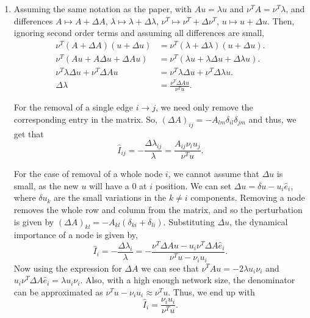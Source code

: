\documentclass[a4paper]{article}
\begin{document}
\begin{enumerate}[label={(6. \alph*)}]
    \item Assuming the same notation as the paper, with $Au = \lambda u$ and $\nu^T A = \nu^T \lambda$, and differences  $A \mapsto A + \Delta A$, $\lambda \mapsto \lambda + \Delta \lambda$, $\nu^T \mapsto \nu^T + \Delta \nu^T$, $u \mapsto u + \Delta u$. Then, ignoring second order terms and assuming all differences are small,
    \begin{equation*}
        \begin{align} 
            \nu^T(A + \Delta A)(u + \Delta u) &= \nu^T (\lambda + \Delta \lambda)(u + \Delta u) .\\
            \nu^T(Au + A\Delta u + \Delta A u) &= \nu^T (\lambda u + \lambda \Delta u + \Delta \lambda u).\\
            \nu^T\lambda\Delta u + \nu^T\Delta Au &= \nu^T \lambda \Delta u + \nu^T \Delta \lambda u.\\
            \Delta \lambda &= \frac{\nu^T \Delta A u}{\nu^T u}. 
        \end{align}
    \end{equation*}

    For the removal of a single edge $i \rightarrow j$, we need only remove the corresponding entry in the matrix. So, $(\Delta A)_{ij} = -A_{lm} \delta_{il}\delta_{jm}$ and thus, we get that
    \[
        \hat{I}_{ij} = -\frac{\Delta \lambda_{ij}}{\lambda} = \frac{A_{ij}\nu_{i}u_{j}}{\nu^T u}
    .\] 

    For the case of removal of a whole node $i$, we cannot assume that  $\Delta u$ is small, as the new  $u$ will have a 0 at  $i$ position. We can set  $\Delta u = \delta u - u_i\hat{e}_i$, where $\delta u_k$ are the small variations in the $k \neq i$ components. Removing a node removes the whole row and column from the matrix, and so the perturbation is given by $(\Delta A)_{kl} = -A_{kl}(\delta_{ki} + \delta_{li})$. Substituting $\Delta u$, the dynamical importance of a node is given by,
    \[
        \hat{I}_{i} = -\frac{\Delta \lambda_{i}}{\lambda} = -\frac{\nu^T\Delta A u - u_i \nu^T \Delta A \hat{e}_i}{\nu^Tu - \nu_i u_i}
    .\] 
    Now using the expression for $\Delta A$ we can see that  $\nu^T A u = -2 \lambda u_i \nu_i$ and  $u_i \nu^T \Delta A \hat{e}_i = \lambda u_i \nu_i$. Also, with a high enough network size, the denominator can be approximated as $\nu^T u - \nu_i u_i \approx \nu^T u$. Thus, we end up with
    \[
        \hat{I}_{i} = \frac{\nu_i u_i}{\nu^T u}
    .\]



\end{enumerate}

\pagebreak


\end{document}
